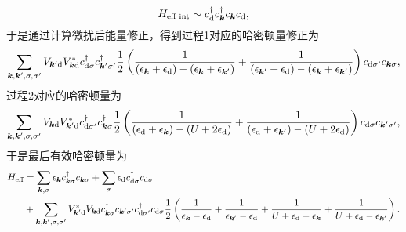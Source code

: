 \documentclass[hyperref, UTF8, a4paper]{ctexart}
\begin{document}
\[
    {H}_\text{eff int} \sim {c}^\dagger_{\text{d}} {c}^\dagger_{\vb*{k}} {c}_{\vb*{k}} {c}_{\text{d}},
\]
于是通过计算微扰后能量修正，得到过程1对应的哈密顿量修正为
\[
    \sum_{\vb*{k}, \vb*{k}', \sigma, \sigma'} V_{\vb*{k}' \text{d}} V^*_{\vb*{k} \text{d}} 
    {c}_{\text{d} \sigma}^\dagger {c}^\dagger_{\vb*{k}' \sigma'} 
    \frac{1}{2} \left( 
        \frac{1}{(\epsilon_{\vb*{k}} + \epsilon_\text{d}) - (\epsilon_{\vb*{k}} + \epsilon_{\vb*{k}'})} + \frac{1}{(\epsilon_{\vb*{k}'} + \epsilon_\text{d}) - (\epsilon_{\vb*{k}} + \epsilon_{\vb*{k}'})} 
    \right)
    {c}_{\text{d} \sigma'} {c}_{\vb*{k} \sigma} ,
\]
过程2对应的哈密顿量为
\[
    \sum_{\vb*{k}, \vb*{k}', \sigma, \sigma'} V_{\vb*{k} \text{d}} V_{\vb*{k}' \text{d}}^*
    {c}^\dagger_{\text{d} \sigma'} {c}^\dagger_{\vb*{k} \sigma}
    \frac{1}{2} \left(
        \frac{1}{(\epsilon_\text{d} + \epsilon_{\vb*{k}}) - (U + 2 \epsilon_{\text{d}})} + \frac{1}{(\epsilon_\text{d} + \epsilon_{\vb*{k}'}) - (U + 2 \epsilon_{\text{d}})}
    \right)
    {c}_{\text{d} \sigma} {c}_{\vb*{k}' \sigma'},
\]
于是最后有效哈密顿量为
\begin{equation}
    \begin{aligned}
        {H}_\text{eff} &= \sum_{\vb*{k}, \sigma} \epsilon_{\vb*{k}} {c}_{\vb*{k}\sigma}^\dagger {c}_{\vb*{k} \sigma} + \sum_\sigma \epsilon_\text{d} {c}_{\text{d}\sigma}^\dagger {c}_{\text{d} \sigma} \\
        & + \sum_{\vb*{k}, \vb*{k}', \sigma, \sigma'} V_{\vb*{k}' \text{d}}^* V_{\vb*{k} \text{d}} {c}^\dagger_{\vb*{k} \sigma} {c}_{\vb*{k}' \sigma'} {c}^\dagger_{\text{d} \sigma'} {c}_{\text{d} \sigma} 
        \frac{1}{2} \left( \frac{1}{\epsilon_{\vb*{k}}- \epsilon_\text{d}} + \frac{1}{\epsilon_{\vb*{k}'} - \epsilon_\text{d}} + \frac{1}{U + \epsilon_\text{d} - \epsilon_{\vb*{k}}} + \frac{1}{U + \epsilon_\text{d} - \epsilon_{\vb*{k}'}} \right).
    \end{aligned}
    \label{eq:effective-anderson}
\end{equation}
\end{document}
